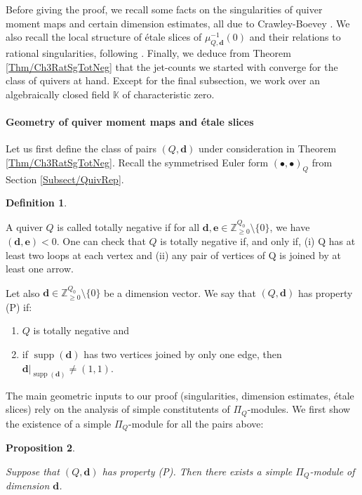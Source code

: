 \documentclass[11pt,english]{article}
\numberwithin{equation}{section}
\numberwithin{figure}{section}
\theoremstyle{definition}
\newtheorem{df}{Definition}[subsection]
\theoremstyle{plain}
\newtheorem{prop}[df]{Proposition}
\theoremstyle{remark}
\DeclareMathOperator{\supp}{supp}
\newcommand\dd{\mathbf{d}}
\newcommand\ee{\mathbf{e}}
\newcommand\ZZ{\mathbb{Z}}
\newcommand\KK{\mathbb{K}}
\begin{document}
Before giving the proof, we recall some facts on the singularities
of quiver moment maps and certain dimension estimates, all due to
Crawley-Boevey \cite{CB01,CB03a}. We also recall the local structure
of étale slices of $\mu_{Q,\dd}^{-1}(0)$ and their relations to rational
singularities, following \cite{CB03a,Bud21}. Finally, we deduce from
Theorem \ref{Thm/Ch3RatSgTotNeg} that the jet-counts we started with
converge for the class of quivers at hand. Except for the final subsection,
we work over an algebraically closed field $\KK$ of characteristic
zero.

\paragraph*{Geometry of quiver moment maps and étale slices}

Let us first define the class of pairs $(Q,\dd)$ under consideration
in Theorem \ref{Thm/Ch3RatSgTotNeg}. Recall the symmetrised Euler
form $(\bullet,\bullet)_{Q}$ from Section \ref{Subsect/QuivRep}.

\begin{df} \label{Def/Prop(P)}

A quiver $Q$ is called totally negative if for all $\dd,\ee\in\ZZ_{\geq0}^{Q_{0}}\setminus\{0\}$,
we have $(\dd,\ee)<0$. One can check that $Q$ is totally negative
if, and only if, (i) Q has at least two loops at each vertex and (ii)
any pair of vertices of Q is joined by at least one arrow.

Let also $\dd\in\ZZ_{\geq0}^{Q_{0}}\setminus\{0\}$ be a dimension
vector. We say that $(Q,\dd)$ has property (P) if:
\begin{enumerate}
\item $Q$ is totally negative and
\item if $\supp(\dd)$ has two vertices joined by only one edge, then $\dd\vert_{\supp(\dd)}\ne(1,1)$.
\end{enumerate}
\end{df}

The main geometric inputs to our proof (singularities, dimension estimates,
étale slices) rely on the analysis of simple constitutents of $\Pi_{Q}$-modules.
We first show the existence of a simple $\Pi_{Q}$-module for all
the pairs above:

\begin{prop} \label{Prop/TotNegSimp}

Suppose that $(Q,\dd)$ has property (P). Then there exists a simple
$\Pi_{Q}$-module of dimension $\dd$.

\end{prop}
\end{document}
